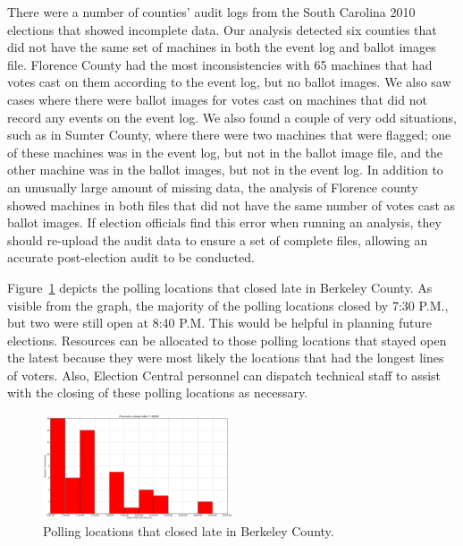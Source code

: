 There were a number of counties' audit logs from the South Carolina
2010 elections that showed incomplete data.  Our analysis detected six
counties that did not have the same set of machines in both the event
log and ballot images file.  Florence County had the most
inconsistencies with 65 machines that had votes cast on them according
to the event log, but no ballot images.  We also saw cases where there
were ballot images for votes cast on machines that did not record any
events on the event log.  We also found a couple of very odd
situations, such as in Sumter County, where there were two machines
that were flagged; one of these machines was in the event log, but not
in the ballot image file, and the other machine was in the ballot
images, but not in the event log.  In addition to an unusually large
amount of missing data, the analysis of Florence county showed
machines in both files that did not have the same number of votes cast
as ballot images.  If election officials find this error when running
an analysis,  they should re-upload the audit data to ensure a set of
complete files, allowing an accurate post-election audit to be conducted.


Figure~\ref{fig:late} depicts the polling locations that closed late in Berkeley County.  As visible from the graph, the majority of the polling locations closed by 7:30 P.M., but two were still open at 8:40 P.M.  This would be helpful in planning future elections.  Resources can be allocated to those polling locations that stayed open the latest because they were most likely the locations that had the longest lines of voters.  Also, Election Central personnel can dispatch technical staff to assist with the closing of these polling locations as necessary.   

\begin{figure}[h]
  \caption{Polling locations that closed late in Berkeley County.}
  \label{fig:late}
  \centering
    \includegraphics[width=0.5\textwidth]{berkeley}
\end{figure}

